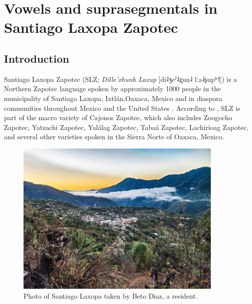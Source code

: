 %
%

\chapter{Vowels and suprasegmentals in Santiago Laxopa Zapotec} \label{ch:SLZ}

\section{Introduction} \label{sec:SLZ-intro}

Santiago Laxopa Zapotec (SLZ; \textit{Dille'xhunh Laxup} [di˨ʒeˀ˨ʐun˨ lːa˨ʂupʰ˦]) is a Northern Zapotec language spoken by approximately 1000 people in the municipality of Santiago Laxopa, Ixtlán,Oaxaca, Mexico and in diaspora communities throughout Mexico and the United States \citep{adlerAcousticsPhonationTypes2016,adlerDerivationVerbInitiality2018,foleyForbiddenCliticClusters2018,foleyExtendingPersonCaseConstraint2022}. 
According to \citet{smith-starkAlgunasIsoglosasZapotecas2007}, SLZ is part of the macro variety of Cajonos Zapotec, which also includes Zoogocho Zapotec, Yatzachi Zapotec, Yalálag Zapotec, Tabaá Zapotec, Lachirioag Zapotec, and several other varieties spoken in the Sierra Norte of Oaxaca, Mexico.

\begin{figure}[h!]
    \centering
    \includegraphics[width=0.9\textwidth]{images/SantiagoLaxopa.jpeg}
    \caption{Photo of Santiago Laxopa taken by Beto Diaz, a resident.}
    \label{fig:SantiagoLaxopa}
\end{figure}

